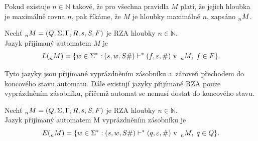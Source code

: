 Pokud existuje $n \in \mathbb{N}$ takové, že pro všechna pravidla $M$ platí, že jejich hloubka je maximálně rovna $n$, pak říkáme, že $M$ je hloubky maximálně $n$, zapsáno $\prescript{}{n}{M}$.

\begin{definition}\label{def_jazyk_rza}
    Nechť $\prescript{}{n}{M} = (Q, \Sigma, \Gamma, R, s, S, F)$ je RZA hloubky $n \in \mathbb{N}$. \\
    Jazyk přijímaný automatem $M$ je
    \begin{equation*}
        L(\prescript{}{n}{M}) = \{w \in \Sigma^*: (s, w, S\#) \vdash^* (f, \varepsilon, \#) \text{ v } \prescript{}{n}{M},\; f \in F\}.
    \end{equation*}
\end{definition}

Tyto jazyky jsou přijímané vyprázdněním zásobníku a~zároveň přechodem do koncového stavu automatu.
Dále existují jazyky přijímané RZA pouze vyprázdněním zásobníku, přičemž automat se nemusí dostat do koncového stavu.

\begin{definition}\label{def_jazyk_rza_empty}
    Nechť $\prescript{}{n}{M} = (Q, \Sigma, \Gamma, R, s, S, F)$ je RZA hloubky $n \in \mathbb{N}$. \\
    Jazyk přijímaný automatem M vyprázdněním zásobníku je
    \begin{equation*}
        E(\prescript{}{n}{M}) = \{w \in \Sigma^* : (s, w, S\#) \vdash^* (q, \varepsilon, \#) \text{ v~}\prescript{}{n}{M},\; q \in Q\}.
    \end{equation*}
\end{definition}


